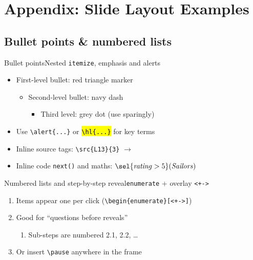 \section{Appendix: Slide Layout Examples}

\subsection{Bullet points \& numbered lists}
\begin{frame}{Bullet points}{Nested \texttt{itemize}, emphasis and alerts}
  \begin{itemize}
    \item First-level bullet: red triangle marker
    \begin{itemize}
      \item Second-level bullet: navy dash
      \begin{itemize}
        \item Third level: grey dot (use sparingly)
      \end{itemize}
    \end{itemize}
    \item Use \alert{\texttt{\textbackslash alert\{...\}}} or \hl{\texttt{\textbackslash hl\{...\}}} for key terms
    \item Inline source tags: \texttt{\textbackslash src\{L13\}\{3\}} $\to$ 
    \item Inline code \texttt{next()} and maths: $\sel{\mathit{rating}>5}(\mathit{Sailors})$
  \end{itemize}
\end{frame}

\begin{frame}{Numbered lists and step-by-step reveal}{\texttt{enumerate} + overlay \texttt{<+->}}
  \begin{enumerate}[<+->]
    \item Items appear one per click (\texttt{\textbackslash begin\{enumerate\}[<+->]})
    \item Good for ``questions before reveals''
    \begin{enumerate}
      \item Sub-steps are numbered 2.1, 2.2, \dots
    \end{enumerate}
    \item Or insert \texttt{\textbackslash pause} anywhere in the frame
  \end{enumerate}
\end{frame}

